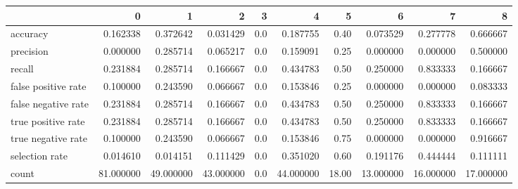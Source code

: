 \begin{tabular}{lrrrrrrrrr}
\toprule
{} &          0 &          1 &          2 &    3 &          4 &      5 &          6 &          7 &          8 \\
\midrule
accuracy            &   0.162338 &   0.372642 &   0.031429 &  0.0 &   0.187755 &   0.40 &   0.073529 &   0.277778 &   0.666667 \\
precision           &   0.000000 &   0.285714 &   0.065217 &  0.0 &   0.159091 &   0.25 &   0.000000 &   0.000000 &   0.500000 \\
recall              &   0.231884 &   0.285714 &   0.166667 &  0.0 &   0.434783 &   0.50 &   0.250000 &   0.833333 &   0.166667 \\
false positive rate &   0.100000 &   0.243590 &   0.066667 &  0.0 &   0.153846 &   0.25 &   0.000000 &   0.000000 &   0.083333 \\
false negative rate &   0.231884 &   0.285714 &   0.166667 &  0.0 &   0.434783 &   0.50 &   0.250000 &   0.833333 &   0.166667 \\
true positive rate  &   0.231884 &   0.285714 &   0.166667 &  0.0 &   0.434783 &   0.50 &   0.250000 &   0.833333 &   0.166667 \\
true negative rate  &   0.100000 &   0.243590 &   0.066667 &  0.0 &   0.153846 &   0.75 &   0.000000 &   0.000000 &   0.916667 \\
selection rate      &   0.014610 &   0.014151 &   0.111429 &  0.0 &   0.351020 &   0.60 &   0.191176 &   0.444444 &   0.111111 \\
count               &  81.000000 &  49.000000 &  43.000000 &  0.0 &  44.000000 &  18.00 &  13.000000 &  16.000000 &  17.000000 \\
\bottomrule
\end{tabular}
